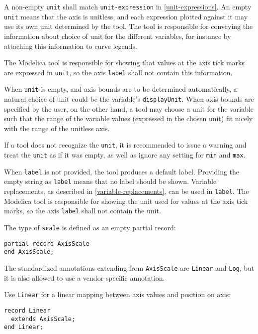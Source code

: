 A non-empty \lstinline!unit! shall match \lstinline[language=grammar]!unit-expression! in \cref{unit-expressions}.
An empty \lstinline!unit! means that the axis is unitless, and each expression plotted against it may use its own unit determined by the tool.
The tool is responsible for conveying the information about choice of unit for the different variables, for instance by attaching this information to curve legends.

The Modelica tool is responsible for showing that values at the axis tick marks are expressed in \lstinline!unit!, so the axis \lstinline!label! shall not contain this information.

\begin{nonnormative}
When \lstinline!unit! is empty, and axis bounds are to be determined automatically, a natural choice of unit could be the variable's \lstinline!displayUnit!.
When axis bounds are specified by the user, on the other hand, a tool may choose a unit for the variable such that the range of the variable values (expressed in the chosen unit) fit nicely with the range of the unitless axis.
\end{nonnormative}

If a tool does not recognize the \lstinline!unit!, it is recommended to issue a warning and treat the \lstinline!unit! as if it was empty, as well as ignore any setting for \lstinline!min! and \lstinline!max!.

When \lstinline!label! is not provided, the tool produces a default label.
Providing the empty string as \lstinline!label! means that no label should be shown.
Variable replacements, as described in \cref{variable-replacements}, can be used in \lstinline!label!.
The Modelica tool is responsible for showing the unit used for values at the axis tick marks, so the axis \lstinline!label! shall not contain the unit.

The type of \lstinline!scale! is defined as an empty partial record:
\begin{lstlisting}[language=modelica]
partial record AxisScale
end AxisScale;
\end{lstlisting}%

The standardized annotations extending from \lstinline!AxisScale! are \lstinline!Linear! and  \lstinline!Log!, but it is also allowed to use a vendor-specific annotation.

Use \lstinline!Linear! for a linear mapping between axis values and position on axis:
\begin{lstlisting}[language=modelica]
record Linear
  extends AxisScale;
end Linear;
\end{lstlisting}%

